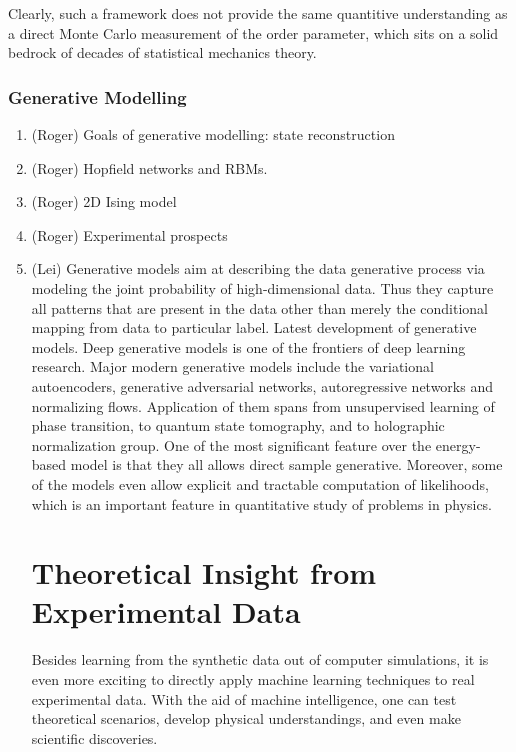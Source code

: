 \documentclass[aps,prb,floatfix,amsmath,amssymb,amsfonts,10pt,floatfix,longbibliography]{revtex4-1}
\begin{document}
Clearly, such a framework does not provide the same quantitive understanding as a direct
Monte Carlo measurement of the order parameter, which sits on a solid bedrock of decades
of statistical mechanics theory.



\subsubsection{Generative Modelling}
\label{sec:WF}
\begin{enumerate}
\item (Roger) Goals of generative modelling: state reconstruction
\item (Roger) Hopfield networks and RBMs.
\item (Roger) 2D Ising model
\item (Roger) Experimental prospects

\item (Lei) Generative models aim at describing the data generative process via modeling the joint probability of high-dimensional data. Thus they capture all patterns that are present in the data other than merely the conditional mapping from data to particular label. Latest development of generative models. Deep generative models is one of the frontiers of deep learning research. Major modern generative models include the variational autoencoders, generative adversarial networks, autoregressive networks and normalizing flows. Application of them spans from unsupervised learning of phase transition, to quantum state tomography, and to holographic normalization group. One of the most significant feature over the energy-based model is that they all allows direct sample generative. Moreover, some of the models even allow explicit and tractable computation of likelihoods, which is an important feature in quantitative study of problems in physics. 


\section{Theoretical Insight from Experimental Data}
\label{sec:data}
Besides learning from the synthetic data out of computer simulations, it is even more exciting to directly apply machine learning techniques to real experimental data. With the aid of machine intelligence, one can test theoretical scenarios, develop physical understandings, and even make scientific discoveries. 


\end{enumerate}
\end{document}
